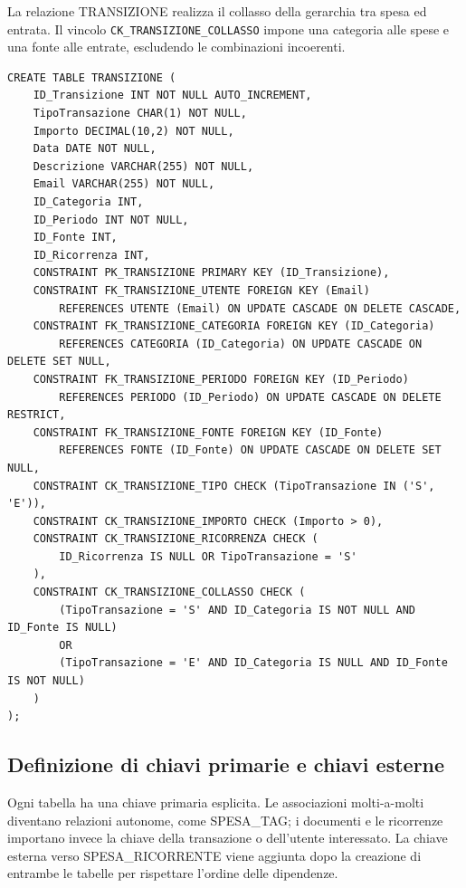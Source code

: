 \documentclass[11pt,a4paper]{article}
\begin{document}
La relazione \textsc{TRANSIZIONE} realizza il collasso della gerarchia tra spesa ed entrata. Il vincolo \texttt{CK\_TRANSIZIONE\_COLLASSO} impone una categoria alle spese e una fonte alle entrate, escludendo le combinazioni incoerenti.

\begin{lstlisting}[caption={Tabella TRANSIZIONE e vincolo sul tipo di movimento}]
CREATE TABLE TRANSIZIONE (
    ID_Transizione INT NOT NULL AUTO_INCREMENT,
    TipoTransazione CHAR(1) NOT NULL,
    Importo DECIMAL(10,2) NOT NULL,
    Data DATE NOT NULL,
    Descrizione VARCHAR(255) NOT NULL,
    Email VARCHAR(255) NOT NULL,
    ID_Categoria INT,
    ID_Periodo INT NOT NULL,
    ID_Fonte INT,
    ID_Ricorrenza INT,
    CONSTRAINT PK_TRANSIZIONE PRIMARY KEY (ID_Transizione),
    CONSTRAINT FK_TRANSIZIONE_UTENTE FOREIGN KEY (Email)
        REFERENCES UTENTE (Email) ON UPDATE CASCADE ON DELETE CASCADE,
    CONSTRAINT FK_TRANSIZIONE_CATEGORIA FOREIGN KEY (ID_Categoria)
        REFERENCES CATEGORIA (ID_Categoria) ON UPDATE CASCADE ON DELETE SET NULL,
    CONSTRAINT FK_TRANSIZIONE_PERIODO FOREIGN KEY (ID_Periodo)
        REFERENCES PERIODO (ID_Periodo) ON UPDATE CASCADE ON DELETE RESTRICT,
    CONSTRAINT FK_TRANSIZIONE_FONTE FOREIGN KEY (ID_Fonte)
        REFERENCES FONTE (ID_Fonte) ON UPDATE CASCADE ON DELETE SET NULL,
    CONSTRAINT CK_TRANSIZIONE_TIPO CHECK (TipoTransazione IN ('S', 'E')),
    CONSTRAINT CK_TRANSIZIONE_IMPORTO CHECK (Importo > 0),
    CONSTRAINT CK_TRANSIZIONE_RICORRENZA CHECK (
        ID_Ricorrenza IS NULL OR TipoTransazione = 'S'
    ),
    CONSTRAINT CK_TRANSIZIONE_COLLASSO CHECK (
        (TipoTransazione = 'S' AND ID_Categoria IS NOT NULL AND ID_Fonte IS NULL)
        OR
        (TipoTransazione = 'E' AND ID_Categoria IS NULL AND ID_Fonte IS NOT NULL)
    )
);
\end{lstlisting}

\subsection{Definizione di chiavi primarie e chiavi esterne}
Ogni tabella ha una chiave primaria esplicita. Le associazioni molti-a-molti diventano relazioni autonome, come \textsc{SPESA\_TAG}; i documenti e le ricorrenze importano invece la chiave della transazione o dell'utente interessato. La chiave esterna verso \textsc{SPESA\_RICORRENTE} viene aggiunta dopo la creazione di entrambe le tabelle per rispettare l'ordine delle dipendenze.
\end{document}
